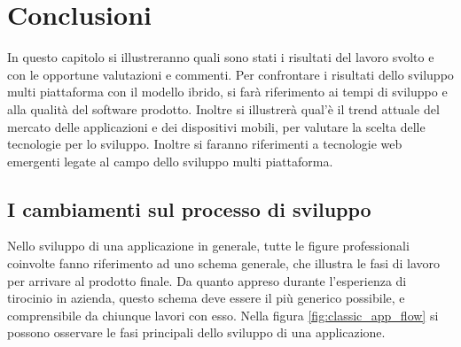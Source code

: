 \chapter{Conclusioni}

In questo capitolo si illustreranno quali sono stati i risultati del lavoro svolto e con le opportune valutazioni e commenti. Per confrontare i risultati dello sviluppo multi piattaforma con il modello ibrido, si farà riferimento ai tempi di sviluppo e alla qualità del software prodotto. Inoltre si illustrerà qual'è il trend attuale del mercato delle applicazioni e dei dispositivi mobili, per valutare la scelta delle tecnologie per lo sviluppo. Inoltre si faranno riferimenti a tecnologie web emergenti legate al campo dello sviluppo multi piattaforma.

\section{I cambiamenti sul processo di sviluppo}
Nello sviluppo di una applicazione in generale, tutte le figure professionali coinvolte fanno riferimento ad uno schema generale, che illustra le fasi di lavoro per arrivare al prodotto finale. Da quanto appreso durante l'esperienza di tirocinio in azienda, questo schema deve essere il più generico possibile, e comprensibile da chiunque lavori con esso. Nella figura \ref{fig:classic_app_flow} si possono osservare le fasi principali dello sviluppo di una applicazione.


